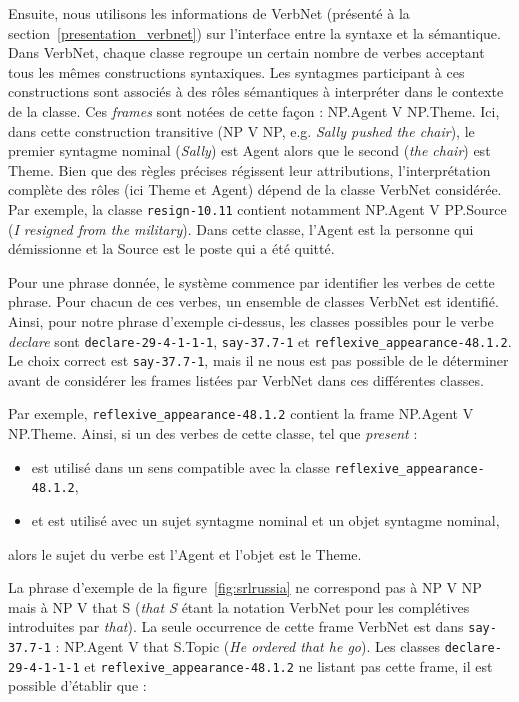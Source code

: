 Ensuite, nous utilisons les informations de VerbNet (présenté à la
section~\ref{presentation_verbnet}) sur l'interface entre la syntaxe
et la sémantique. Dans VerbNet, chaque classe regroupe un certain nombre de
verbes acceptant tous les mêmes constructions syntaxiques. Les syntagmes
participant à ces constructions sont associés à des rôles sémantiques à
interpréter dans le contexte de la classe. Ces \emph{frames} sont notées de
cette façon : NP.Agent V NP.Theme. Ici, dans cette construction transitive
(NP V NP, e.g. \emph{Sally pushed the chair}), le premier syntagme nominal
(\emph{Sally}) est Agent alors que le second (\emph{the chair}) est Theme.
Bien que des règles précises régissent leur attributions, l'interprétation
complète des rôles (ici Theme et Agent) dépend de la classe VerbNet
considérée. Par exemple, la classe \texttt{resign-10.11} contient notamment
NP.Agent V PP.Source (\emph{I resigned from the military}). Dans cette
classe, l'Agent est la personne qui démissionne et la Source est le poste qui
a été quitté.

Pour une phrase donnée, le système commence par identifier les verbes de cette
phrase. Pour chacun de ces verbes, un ensemble de classes VerbNet est
identifié. Ainsi, pour notre phrase d'exemple ci-dessus, les classes possibles
pour le verbe \emph{declare} sont \texttt{declare-29-4-1-1-1},
\texttt{say-37.7-1} et \texttt{reflexive\_appearance-48.1.2}. Le choix correct
est \texttt{say-37.7-1}, mais il ne nous est pas possible de le déterminer
avant de considérer les frames listées par VerbNet dans ces différentes
classes.

Par exemple, \texttt{reflexive\_appearance-48.1.2} contient la frame NP.Agent V
NP.Theme. Ainsi, si un des verbes de cette classe, tel que \emph{present} :
\begin{itemize}
    \item est utilisé dans un sens compatible avec la classe
        \texttt{reflexive\_appearance-48.1.2},
    \item et est utilisé avec un sujet syntagme nominal et un objet syntagme
        nominal,
\end{itemize}
alors le sujet du verbe est l'Agent et l'objet est le Theme.

La phrase d'exemple de la figure~\ref{fig:srlrussia} ne correspond pas à NP V
NP mais à NP V that S (\emph{that S} étant la notation VerbNet pour les
complétives introduites par \emph{that}). La seule occurrence de cette frame
VerbNet est dans \texttt{say-37.7-1} : NP.Agent V that S.Topic (\emph{He
ordered that he go}). Les classes \texttt{declare-29-4-1-1-1} et
\texttt{reflexive\_appearance-48.1.2} ne listant pas cette frame, il est
possible d'établir que :

